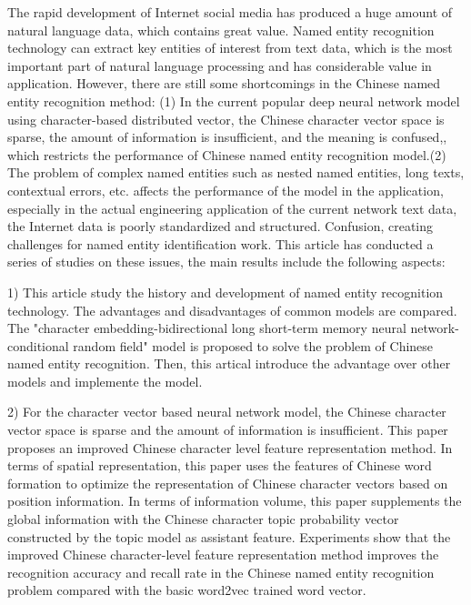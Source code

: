 \documentclass[winfonts,master,oneside,nobackinfo]{njuthesis}
\begin{document}
\begin{englishabstract}
The rapid development of Internet social media has produced a huge amount of natural language data, which contains great value. Named entity recognition technology can extract key entities of interest from text data, which is the most important part of natural language processing and has considerable value in application. However, there are still some shortcomings in the Chinese named entity recognition method: (1) In the current popular deep neural network model using character-based distributed vector, the Chinese character vector space is sparse, the amount of information is insufficient, and the meaning is confused,, which restricts the performance of Chinese named entity recognition model.(2) The problem of complex named entities such as nested named entities, long texts, contextual errors, etc. affects the performance of the model in the application, especially in the actual engineering application of the current network text data, the Internet data is poorly standardized and structured. Confusion, creating challenges for named entity identification work. This article has conducted a series of studies on these issues, the main results include the following aspects:

1) This article study the history and development of named entity recognition technology. The advantages and disadvantages of common models are compared. The "character embedding-bidirectional long short-term memory neural network-conditional random field" model is proposed to solve the problem of Chinese named entity recognition. Then, this artical introduce the advantage over other models and implemente the model.

2) For the character vector based neural network model, the Chinese character vector space is sparse and the amount of information is insufficient. This paper proposes an improved Chinese character level feature representation method. In terms of spatial representation, this paper uses the features of Chinese word formation to optimize the representation of Chinese character vectors based on position information. In terms of information volume, this paper supplements the global information with the Chinese character topic probability vector constructed by the topic model as assistant feature. Experiments show that the improved Chinese character-level feature representation method improves the recognition accuracy and recall rate in the Chinese named entity recognition problem compared with the basic word2vec trained word vector.


\end{englishabstract}
\end{document}
